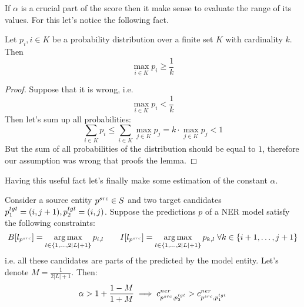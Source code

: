 If \( \alpha \) is a crucial part of the score then it make sense to evaluate the range of its values.
For this let's notice the following fact.
\begin{lemma} \label{lemma:maxprob_greater_than_avg}
    Let \( p_{i}, i \in K \) be a probability distribution over a finite set \( K \) with cardinality \( k \).
    Then
    \[
        \max\limits_{i \in K} p_i \geq \frac{1}{k}
    \]
\end{lemma}
\begin{proof}
    Suppose that it is wrong, i.e.
    \[
        \max\limits_{i \in K} p_i < \frac{1}{k}
    \]
    Then let's sum up all probabilities:
    \[
        \sum\limits_{i \in K} p_i \leq \sum\limits_{i \in K} \max\limits_{j \in K} p_j =
        k \cdot \max\limits_{j \in K} p_j < 1
    \]
    But the sum of all probabilities of the distribution should be equal to \( 1 \), therefore our assumption was
    wrong that proofs the lemma.
\end{proof}
Having this useful fact let's finally make some estimation of the constant \( \alpha \).
\begin{theorem}
    Consider a source entity \( p^{src} \in S \) and two target candidates \( p_1^{tgt} = (i, j+1), p_2^{tgt} = (i, j) \).
    Suppose the predictions \( p \) of a NER model satisfy the following constraints:
    \[
        B[l_{p^{src}}] = \operatorname*{arg\,max}\limits_{l \in \{ 1, \dots, 2|L| + 1 \}} p_{i, l} \qquad
        I[l_{p^{src}}] = \operatorname*{arg\,max}\limits_{l \in \{ 1, \dots, 2|L| + 1 \}} p_{k, l} \; \forall k \in \{ i + 1, \dots ,j +1 \}
    \]
    i.e. all these candidates are parts of the predicted by the model entity.
    Let's denote \( M = \frac{1}{2|L| + 1} \).
    Then:
    \[
        \alpha > 1 + \frac{1 - M}{1 + M} \implies c_{p^{src}, p_2^{tgt}}^{ner} > c_{p^{src}, p_1^{tgt}}^{ner}
    \]
\end{theorem}
